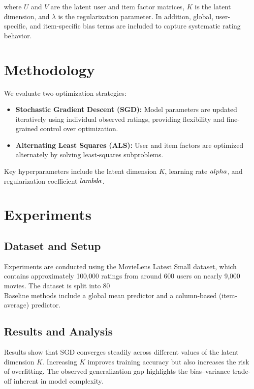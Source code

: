 \documentclass[10pt,twocolumn]{article}
\begin{document}
where $U$ and $V$ are the latent user and item factor matrices, $K$ is the latent dimension, and $\lambda$ is the regularization parameter. In addition, global, user-specific, and item-specific bias terms are included to capture systematic rating behavior.

\section{Methodology}
We evaluate two optimization strategies:

\begin{itemize}
  \item \textbf{Stochastic Gradient Descent (SGD):} Model parameters are updated iteratively using individual observed ratings, providing flexibility and fine-grained control over optimization.
  \item \textbf{Alternating Least Squares (ALS):} User and item factors are optimized alternately by solving least-squares subproblems.
\end{itemize}

Key hyperparameters include the latent dimension $K$, learning rate $\\alpha$, and regularization coefficient $\\lambda$.

\section{Experiments}
\subsection{Dataset and Setup}
Experiments are conducted using the MovieLens Latest Small dataset, which contains approximately 100,000 ratings from around 600 users on nearly 9,000 movies. The dataset is split into 80\\%

Baseline methods include a global mean predictor and a column-based (item-average) predictor.

\subsection{Results and Analysis}
Results show that SGD converges steadily across different values of the latent dimension $K$. Increasing $K$ improves training accuracy but also increases the risk of overfitting. The observed generalization gap highlights the bias--variance trade-off inherent in model complexity.
\end{document}

